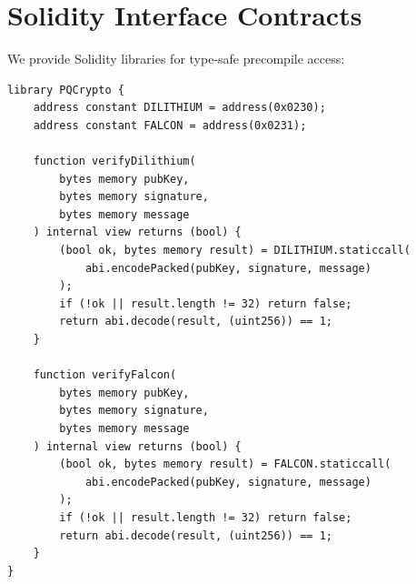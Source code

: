 \section{Solidity Interface Contracts}


We provide Solidity libraries for type-safe precompile access:

\begin{lstlisting}[language=Solidity,caption={Solidity interface library}]
library PQCrypto {
    address constant DILITHIUM = address(0x0230);
    address constant FALCON = address(0x0231);

    function verifyDilithium(
        bytes memory pubKey,
        bytes memory signature,
        bytes memory message
    ) internal view returns (bool) {
        (bool ok, bytes memory result) = DILITHIUM.staticcall(
            abi.encodePacked(pubKey, signature, message)
        );
        if (!ok || result.length != 32) return false;
        return abi.decode(result, (uint256)) == 1;
    }

    function verifyFalcon(
        bytes memory pubKey,
        bytes memory signature,
        bytes memory message
    ) internal view returns (bool) {
        (bool ok, bytes memory result) = FALCON.staticcall(
            abi.encodePacked(pubKey, signature, message)
        );
        if (!ok || result.length != 32) return false;
        return abi.decode(result, (uint256)) == 1;
    }
}
\end{lstlisting}

